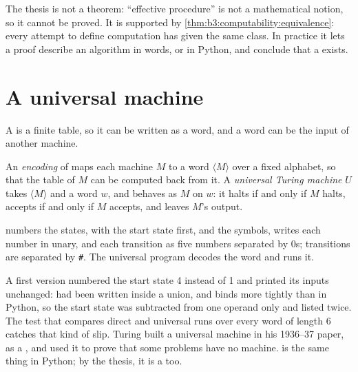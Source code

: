The thesis is not a theorem: ``effective procedure'' is not a mathematical notion, so it cannot be proved. It is supported by \cref{thm:b3:computability:equivalence}: every attempt to define computation has given the same class. %
In practice it lets a proof describe an algorithm in words, or in Python, and conclude that a  exists.

\section{A universal machine}\label{sec:b3:computability:universal}

A  is a finite table, so it can be written as a word, and a word can be the input of another machine.

\begin{definition}\label{def:b3:computability:universal}
An \emph{encoding} of  maps each machine $M$ to a word $\langle M \rangle$ over a fixed alphabet, so that the table of $M$ can be computed back from it. A \emph{universal Turing machine} $U$ takes $\langle M \rangle$ and a word $w$, and behaves as $M$ on $w$: it halts if and only if $M$ halts, accepts if and only if $M$ accepts, and leaves $M$'s output.
\end{definition}

 numbers the states, with the start state first, and the symbols, writes each number in unary, and each transition as five numbers separated by 0s; transitions are separated by \texttt{\#}. The universal program decodes the word and runs it.

\label{lst:b3:computability:utm}

\label{out:b3:computability:utm}

A first version numbered the start state 4 instead of 1 and printed its inputs unchanged:  had been written inside a union, and \code{-} binds more tightly than \code{|} in Python, so the start state was subtracted from one operand only and listed twice. The test that compares direct and universal runs over every word of length 6 catches that kind of slip. Turing built a universal machine in his 1936--37 paper, as a , and used it to prove that some problems have no machine. %
 is the same thing in Python; by the thesis, it is a  too.

